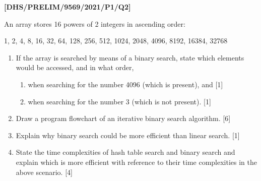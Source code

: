 \item \textbf{{[}DHS/PRELIM/9569/2021/P1/Q2{]} }

An array stores 16 powers of 2 integers in ascending order: 

1, 2, 4, 8, 16, 32, 64, 128, 256, 512, 1024, 2048, 4096, 8192, 16384,
32768 
\begin{enumerate}
\item If the array is searched by means of a binary search, state which
elements would be accessed, and in what order,
\begin{enumerate}
\item when searching for the number 4096 (which is present), and \hfill{}{[}1{]}
\item when searching for the number 3 (which is not present). \hfill{}{[}1{]}
\end{enumerate}
\item Draw a program flowchart of an iterative binary search algorithm.
\hfill{}{[}6{]}
\item Explain why binary search could be more efficient than linear search.
\hfill{} {[}1{]}
\item State the time complexities of hash table search and binary search
and explain which is more efficient with reference to their time complexities
in the above scenario. \hfill{} {[}4{]}
\end{enumerate}